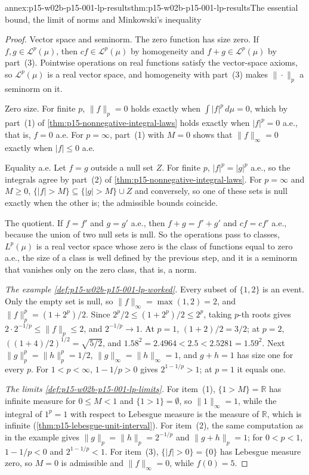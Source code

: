 \begin{annexitem}{annex:p15-w02b-p15-001-lp-results}{thm:p15-w02b-p15-001-lp-results}{The essential bound, the limit of norms and Minkowski's inequality}
\begin{proof}
Vector space and seminorm. The zero function has size zero. If
\(f,g\in\mathcal L^p(\mu)\), then \(cf\in\mathcal L^p(\mu)\) by
homogeneity and \(f+g\in\mathcal L^p(\mu)\) by part~(3). Pointwise
operations on real functions satisfy the vector-space axioms, so
\(\mathcal L^p(\mu)\) is a real vector space, and homogeneity with
part~(3) makes \(\|\cdot\|_p\) a seminorm on it.

Zero size. For finite \(p\), \(\|f\|_p=0\) holds exactly when
\(\int|f|^p\,d\mu=0\), which by part~(1) of
\cref{thm:p15-nonnegative-integral-laws} holds exactly when
\(|f|^p=0\) a.e., that is, \(f=0\) a.e. For \(p=\infty\), part~(1)
with \(M=0\) shows that \(\|f\|_\infty=0\) exactly when \(|f|\leq0\)
a.e.

Equality a.e. Let \(f=g\) outside a null set \(Z\). For finite \(p\),
\(|f|^p=|g|^p\) a.e., so the integrals agree by part~(2) of
\cref{thm:p15-nonnegative-integral-laws}. For \(p=\infty\) and
\(M\geq0\), \(\{|f|>M\}\subseteq\{|g|>M\}\cup Z\) and conversely, so
one of these sets is null exactly when the other is; the admissible
bounds coincide.

The quotient. If \(f=f'\) and \(g=g'\) a.e., then \(f+g=f'+g'\) and
\(cf=cf'\) a.e., because the union of two null sets is null. So the
operations pass to classes, \(L^p(\mu)\) is a real vector space whose
zero is the class of functions equal to zero a.e., the size of a class
is well defined by the previous step, and it is a seminorm that
vanishes only on the zero class, that is, a norm.

\emph{The example \cref{def:p15-w02b-p15-001-lp-worked}.} Every subset
of \(\{1,2\}\) is an event. Only the empty set is null, so
\(\|f\|_\infty=\max(1,2)=2\), and
\(\|f\|_p^p=(1+2^p)/2\). Since \(2^p/2\leq(1+2^p)/2\leq2^p\), taking
\(p\)-th roots gives \(2\cdot2^{-1/p}\leq\|f\|_p\leq2\), and
\(2^{-1/p}\to1\). At \(p=1\), \((1+2)/2=3/2\); at \(p=2\),
\(((1+4)/2)^{1/2}=\sqrt{5/2}\), and \(1.58^2=2.4964<2.5<2.5281=1.59^2\).
Next \(\|g\|_p^p=\|h\|_p^p=1/2\), \(\|g\|_\infty=\|h\|_\infty=1\), and
\(g+h=1\) has size one for every \(p\). For \(1<p<\infty\),
\(1-1/p>0\) gives \(2^{1-1/p}>1\); at \(p=1\) it equals one.

\emph{The limits \cref{def:p15-w02b-p15-001-lp-limits}.} For item~(1),
\(\{1>M\}=\mathbb R\) has infinite measure for \(0\leq M<1\) and
\(\{1>1\}=\emptyset\), so \(\|1\|_\infty=1\), while
the integral of \(1^p=1\) with respect to Lebesgue measure is the
measure of \(\mathbb R\), which is infinite (\cref{thm:p15-lebesgue-unit-interval}). For item~(2), the same
computation as in the example gives \(\|g\|_p=\|h\|_p=2^{-1/p}\) and
\(\|g+h\|_p=1\); for \(0<p<1\), \(1-1/p<0\) and \(2^{1-1/p}<1\). For
item~(3), \(\{|f|>0\}=\{0\}\) has Lebesgue measure zero, so \(M=0\) is
admissible and \(\|f\|_\infty=0\), while \(f(0)=5\).
\end{proof}
\end{annexitem}

